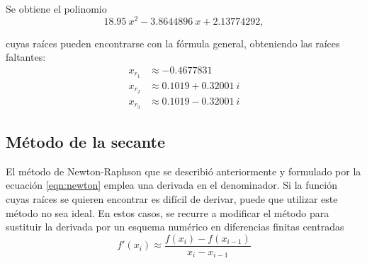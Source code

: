 \begin{ex}
\begin{solution}
        Se obtiene el polinomio
        \[
            18.95\ x^2 - 3.8644896\ x + 2.13774292,
        \]
    
        \noindent cuyas raíces pueden encontrarse con la fórmula general,
        obteniendo las raíces faltantes:
        \begin{align*}
            x_{r_1} & \approx -0.4677831 \\
            x_{r_2} & \approx 0.1019 + 0.32001\ i \\
            x_{r_3} & \approx 0.1019 - 0.32001\ i 
        \end{align*}
    \end{solution}
\end{ex}

\subsection{Método de la secante}

El método de Newton-Raphson que se describió anteriormente y formulado por la
ecuación \ref{eqn:newton} emplea una derivada en el denominador. Si la función
cuyas raíces se quieren encontrar es difícil de derivar, puede que utilizar este
método no sea ideal. En estos casos, se recurre a modificar el método para
sustituir la derivada por un esquema numérico en diferencias finitas centradas
\[
    f'(x_i) \approx \frac{f(x_i) - f(x_{i-1})}{x_i - x_{i-1}}
\]
